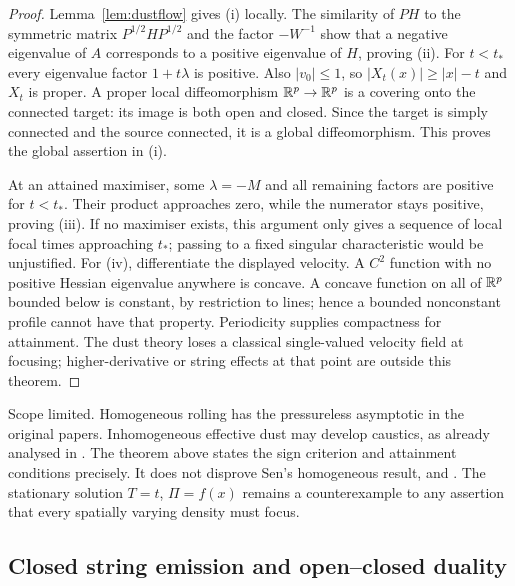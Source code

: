 \begin{proof}
Lemma~\ref{lem:dustflow} gives (i) locally. The similarity of $PH$ to the symmetric matrix $P^{1/2}HP^{1/2}$ and the factor $-W^{-1}$ show that a negative eigenvalue of $A$ corresponds to a positive eigenvalue of $H$, proving (ii). For $t<t_*$ every eigenvalue factor $1+t\lambda$ is positive. Also $|v_0|\le1$, so $|X_t(x)|\ge |x|-t$ and $X_t$ is proper. A proper local diffeomorphism $\mathbb{R}^p\to\mathbb{R}^p$ is a covering onto the connected target: its image is both open and closed. Since the target is simply connected and the source connected, it is a global diffeomorphism. This proves the global assertion in (i).

At an attained maximiser, some $\lambda=-M$ and all remaining factors are positive for $t<t_*$. Their product approaches zero, while the numerator stays positive, proving (iii). If no maximiser exists, this argument only gives a sequence of local focal times approaching $t_*$; passing to a fixed singular characteristic would be unjustified. For (iv), differentiate the displayed velocity. A $C^2$ function with no positive Hessian eigenvalue anywhere is concave. A concave function on all of $\mathbb{R}^p$ bounded below is constant, by restriction to lines; hence a bounded nonconstant profile cannot have that property. Periodicity supplies compactness for attainment. The dust theory loses a classical single-valued velocity field at focusing; higher-derivative or string effects at that point are outside this theorem.
\end{proof}

\begin{verdict}[claim 17]
Scope limited. Homogeneous rolling has the pressureless asymptotic in the original papers. Inhomogeneous effective dust may develop caustics, as already analysed in \cite{FKS02,FK04,Barnaby04}. The theorem above states the sign criterion and attainment conditions precisely. It does not disprove Sen's homogeneous result, and . The stationary solution $T=t$, $\Pi=f(x)$ remains a counterexample to any assertion that every spatially varying density must focus.
\end{verdict}

\subsection{Closed string emission and open--closed duality}\label{ssec:emission}

